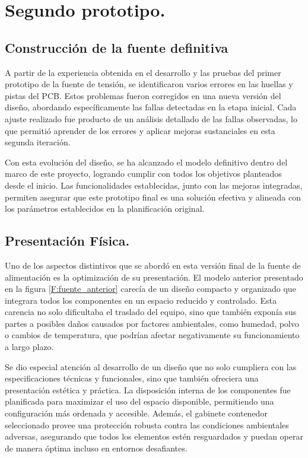 \chapter{Segundo prototipo.}

\label{C:Construcción de modelo final}

\section{Construcción de la fuente definitiva}

A partir de la experiencia obtenida en el desarrollo y las pruebas del primer prototipo de la fuente de tensión, se identificaron varios errores en las huellas y pistas del PCB. Estos problemas fueron corregidos en una nueva versión del diseño, abordando específicamente las fallas detectadas en la etapa inicial. Cada ajuste realizado fue producto de un análisis detallado de las fallas observadas, lo que permitió aprender de los errores y aplicar mejoras sustanciales en esta segunda iteración.\par 
Con esta evolución del diseño, se ha alcanzado el modelo definitivo dentro del marco de este proyecto, logrando cumplir con todos los objetivos planteados desde el inicio. Las funcionalidades establecidas, junto con las mejoras integradas, permiten asegurar que este prototipo final es una solución efectiva y alineada con los parámetros establecidos en la planificación original.\par

\section{Presentación Física.}
Uno de los aspectos distintivos que se abordó en esta versión final de la fuente de alimentación es la optimización de su presentación. El modelo anterior presentado en la figura \ref{F:fuente_anterior} carecía de un diseño compacto y organizado que integrara todos los componentes en un espacio reducido y controlado. Esta carencia no solo dificultaba el traslado del equipo, sino que también exponía sus partes a posibles daños causados por factores ambientales, como humedad, polvo o cambios de temperatura, que podrían afectar negativamente su funcionamiento a largo plazo.\par
Se dio especial atención al desarrollo de un diseño que no solo cumpliera con las especificaciones técnicas y funcionales, sino que también ofreciera una presentación estética y práctica. La disposición interna de los componentes fue planificada para maximizar el uso del espacio disponible, permitiendo una configuración más ordenada y accesible. Además, el gabinete contenedor seleccionado provee una protección robusta contra las condiciones ambientales adversas, asegurando que todos los elementos estén resguardados y puedan operar de manera óptima incluso en entornos desafiantes.\par

